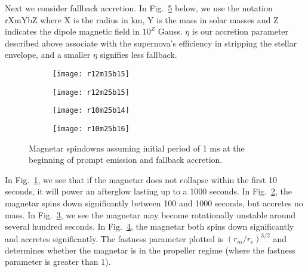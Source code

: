\documentclass{article}
\begin{document}
Next we consider fallback accretion. In Fig.~\ref{fig:4} below, we use the notation rXmYbZ where X is the radius in km, Y is the mass in solar masses and Z indicates the dipole magnetic field in $10^Z$ Gauss. $\eta$ is our accretion parameter described above associate with the supernova's efficiency in stripping the stellar envelope, and a smaller $\eta$ signifies less fallback.
\begin{figure}[h!]
\centering
\begin{subfigure}{.5\textwidth}
    \centering
    \texttt{[image: r12m15b15]}
    \caption{}
    \label{fig:4a}
\end{subfigure}%
\begin{subfigure}{.5\textwidth}
    \centering
    \texttt{[image: r12m25b15]}
    \caption{}
    \label{fig:4b}
\end{subfigure}
\begin{subfigure}{.5\textwidth}
    \centering
    \texttt{[image: r10m25b14]}
    \caption{}
    \label{fig:4c}
\end{subfigure}%
\begin{subfigure}{.5\textwidth}
    \centering
    \texttt{[image: r10m25b16]}
    \caption{}
    \label{fig:4d}
\end{subfigure}
\caption{Magnetar spindowns assuming initial period of 1 ms at the beginning of prompt emission and fallback accretion.}
\label{fig:4}
\end{figure}

In Fig.~\ref{fig:4a}, we see that if the magnetar does not collapse within the first 10 seconds, it will power an afterglow lasting up to a 1000 seconds. In Fig.~\ref{fig:4b}, the magnetar spins down significantly between 100 and 1000 seconds, but accretes no mass. In Fig.~\ref{fig:4c}, we see the magnetar may become rotationally unstable around several hundred seconds. In Fig.~\ref{fig:4d}, the magnetar both spins down significantly and accretes significantly. The fastness parameter plotted is $(r_m/r_c)^{3/2}$ and determines whether the magnetar is in the propeller regime (where the fastness parameter is greater than 1).
\newpage
\end{document}
